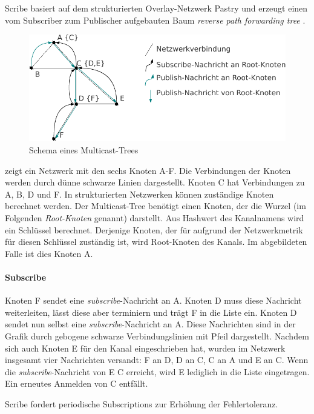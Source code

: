 Scribe basiert auf dem strukturierten Overlay-Netzwerk Pastry \cite{Rowstron2001} und erzeugt einen vom Subscriber zum Publischer aufgebauten Baum \emph{reverse path forwarding tree} \cite{Dalal1978}.

\begin{figure}[htbp]
\centering
\includegraphics{grafics/multicast_tree.pdf}
\caption{Schema eines Multicast-Trees}
\label{fig:multicast_tree}
\end{figure}

 zeigt ein Netzwerk mit den sechs Knoten A-F. Die Verbindungen der Knoten werden durch dünne schwarze Linien dargestellt. Knoten C hat Verbindungen zu A, B, D und F. In strukturierten Netzwerken können zuständige Knoten berechnet werden. Der Multicast-Tree benötigt einen Knoten, der die Wurzel (im Folgenden \emph{Root-Knoten} genannt) darstellt. Aus Hashwert des Kanalnamens wird ein Schlüssel berechnet. Derjenige Knoten, der für aufgrund der Netzwerkmetrik für diesen Schlüssel zuständig ist, wird Root-Knoten des Kanals. Im abgebildeten Falle ist dies Knoten A.

\paragraph*{Subscribe}
Knoten F sendet eine \emph{subscribe}-Nachricht an A. Knoten D muss diese Nachricht weiterleiten, lässt diese aber terminiern und trägt F in die Liste ein. Knoten D sendet nun selbst eine \emph{subscribe}-Nachricht an A. Diese Nachrichten sind in der Grafik durch gebogene schwarze Verbindungslinien mit Pfeil dargestellt. Nachdem sich auch Knoten E für den Kanal eingeschrieben hat, wurden im Netzwerk insgesamt vier Nachrichten versandt: F an D, D an C, C an A und E an C. Wenn die \emph{subscribe}-Nachricht von E C erreicht, wird E lediglich in die Liste eingetragen. Ein erneutes Anmelden von C entfällt.

Scribe fordert periodische Subscriptions zur Erhöhung der Fehlertoleranz.

